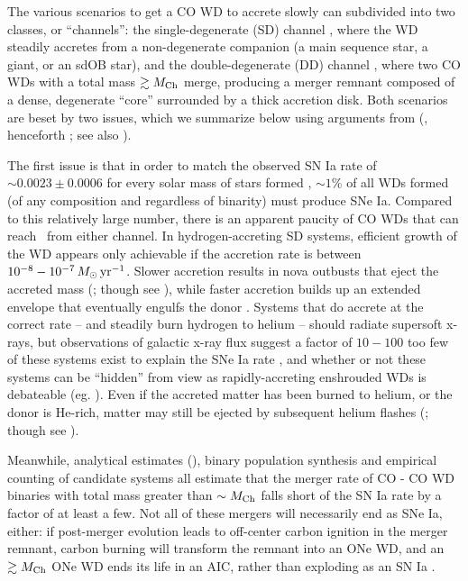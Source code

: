 The various scenarios to get a CO WD to accrete slowly can subdivided into two classes, or ``channels'': the single-degenerate (SD) channel \citep{wheli73}, where the WD steadily accretes from a non-degenerate companion (a main sequence star, a giant, or an sdOB star), and the double-degenerate (DD) channel \citep{ibent84, webb84}, where two CO WDs with a total mass $\gtrsim\Mch$ merge, producing a merger remnant composed of a dense, degenerate ``core'' surrounded by a thick accretion disk.  Both scenarios are beset by two issues, which we summarize below using arguments from \citeauthor{vkercj10} (\citeyear{vkercj10}, henceforth \citeal{vkercj10}; see also \citealt{vker13}).

The first issue is that in order to match the observed SN Ia rate of $\sim 0.0023 \pm 0.0006$ for every solar mass of stars formed \citep{mann+05}, $\sim1$\% of all WDs formed (of any composition and regardless of binarity) must produce SNe Ia.  Compared to this relatively large number, there is an apparent paucity of CO WDs that can reach \Mch\ from either channel.  In hydrogen-accreting SD systems, efficient growth of the WD appears only achievable if the accretion rate is between $10^{-8} - 10^{-7}\,\Msun\,\pyr$.  Slower accretion results in nova outbusts that eject the accreted mass (\citealt{townsb04}; though see \citealt{zorosg11}), while faster accretion builds up an extended envelope that eventually engulfs the donor \citep{ibent84}.  Systems that do accrete at the correct rate -- and steadily burn hydrogen to helium -- should radiate supersoft x-rays, but observations of galactic x-ray flux suggest a factor of $10 - 100$ too few of these systems exist to explain the SNe Ia rate \citep{dist10, gilfb10}, and whether or not these systems can be ``hidden'' from view as rapidly-accreting enshrouded WDs is debateable (eg. \citealt{hachkn10, joha+14}).  Even if the accreted matter has been burned to helium, or the donor is He-rich, matter may still be ejected by subsequent helium flashes (\citealt{idanss13}; though see \citealt{hill+16}).  

Meanwhile, analytical estimates (\citealt{vkercj10}), binary population synthesis \citep{menn+10, ruitbf09, toonnp12, clae+14} and empirical counting of candidate systems \citep{badem12} all estimate that the merger rate of CO - CO WD binaries with total mass greater than $\sim\Mch$ falls short of the SN Ia rate by a factor of at least a few.  Not all of these mergers will necessarily end as SNe Ia, either: if post-merger evolution leads to off-center carbon ignition in the merger remnant, carbon burning will transform the remnant into an ONe WD, and an $\gtrsim\Mch$ ONe WD ends its life in an AIC, rather than exploding as an SN Ia \citep{nomoi85, saion85, yoonpr07, schw+16}.
 

